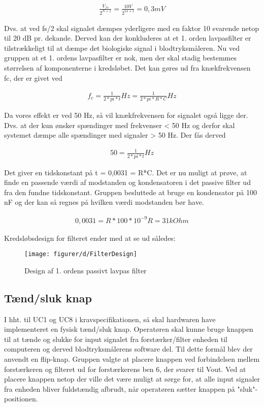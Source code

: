 \begin{align}
\frac{V_{fs}}{2^{N+1}} =  \frac{10 V}{2^{14+1}} = 0,3 mV
\end{align}

Dvs. at ved fs/2 skal signalet dæmpes yderligere med en faktor 10 svarende netop til 20 dB pr. dekande. 
Derved kan der konkluderes at et 1. orden lavpasfilter er tilstrækkeligt til at dæmpe det biologiske signal i blodtryksmåleren.
Nu ved gruppen at et 1. ordens lavpasfilter er nok, men der skal stadig bestemmes størrelsen af komponenterne i kredsløbet. 
Det kan gøres ud fra knækfrekvensen fc, der er givet ved

\begin{align}
f_c = \frac{1}{2*pi*t} Hz =\frac{1}{2*pi*R*C} Hz
\end{align}

Da vores effekt er ved 50 Hz, så vil knækfrekvensen for signalet også ligge der.
Dvs. at der kun ønsker spændinger med frekvenser < 50 Hz og derfor skal systemet dæmpe alle spændinger med signaler > 50 Hz. 
Der fås derved

\begin{align}
50 = \frac{1}{2*pi*t} Hz
\end{align}

Det giver en tidskonstant på t = 0,0031 = R*C. 
Det er nu muligt at prøve, at finde en passende værdi af modstanden og kondensatoren i det passive filter ud fra den fundne tidskonstant. 
Gruppen besluttede at bruge en kondensator på 100 nF og der kan så regnes på hvilken værdi modstanden bør have.

\begin{align}
0,0031 = R*100*10^{-9}
R = 31 k Ohm
\end{align}

Kredsløbsdesign for filteret ender med at se ud således:

\begin{figure}[H]
    \centering
    \texttt{[image: figurer/d/FilterDesign]}
    \caption{Design af 1. ordens passivt lavpas filter}
    \label{figtest_HW3}
\end{figure}

\subsection{Tænd/sluk knap}
I hht. til UC1 og UC8 i kravspecifikationen, så skal hardwaren have implementeret en fysisk tænd/sluk knap. 
Operatøren skal kunne bruge knappen til at tænde og slukke for input signalet fra forstærker/filter enheden til computeren og derved blodtryksmålerens software del. 
Til dette formål blev der anvendt en flip-knap.
Gruppen valgte at placere knappen ved forbindelsen mellem forstærkeren og filteret ud for forstærkerens ben 6, der svarer til Vout.
Ved at placere knappen netop der ville det være muligt at sørge for, at alle input signaler fra enheden bliver fuldstændig afbrudt, når operatøren sætter knappen på "sluk"-positionen.

